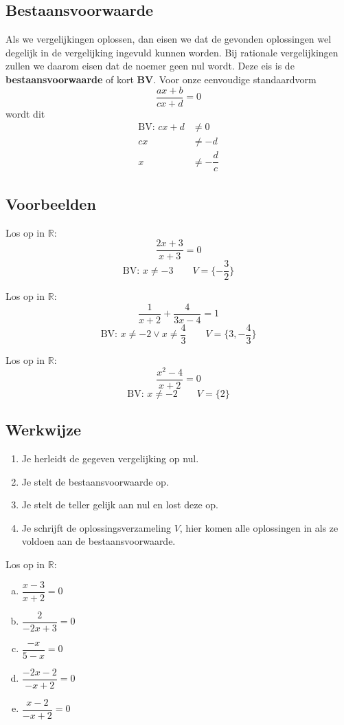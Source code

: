 \documentclass[12pt]{article}
\begin{document}
\subsection{Bestaansvoorwaarde}
Als we vergelijkingen oplossen, dan eisen we dat de gevonden oplossingen wel degelijk in de vergelijking ingevuld kunnen worden. Bij rationale vergelijkingen zullen we daarom eisen dat de noemer geen nul wordt. Deze eis is de {\bf bestaansvoorwaarde} of kort {\bf BV}. Voor onze eenvoudige standaardvorm
$$\dfrac{ax+b}{cx+d}=0$$
wordt dit
\begin{align*}
  \mbox{BV: } cx+d &\neq 0\\
                cx &\neq -d\\
                 x &\neq -\dfrac{d}{c}
\end{align*}


\subsection{Voorbeelden}

Los op in $\mathbb{R}$:
$$\frac{2x+3}{x+3} = 0$$
$$\mbox{BV: }x\neq -3 \qquad V=\{-\dfrac{3}{2}\}$$


Los op in $\mathbb{R}$:
$$\frac{1}{x+2}+\frac{4}{3x-4}=1$$
$$\mbox{BV: }x\neq -2 \vee x\neq \dfrac{4}{3} \qquad V=\{3,-\dfrac{4}{3}\}$$

Los op in $\mathbb{R}$:
$$\frac{x^2-4}{x+2}=0$$
$$\mbox{BV: }x\neq -2 \qquad V=\{2\}$$

\subsection{Werkwijze}
\begin{enumerate}[(1)]
  \item Je herleidt de gegeven vergelijking op nul.
  \item Je stelt de bestaansvoorwaarde op.
  \item Je stelt de teller gelijk aan nul en lost deze op.
  \item Je schrijft de oplossingsverzameling $V$, hier komen alle oplossingen in als ze voldoen aan de bestaansvoorwaarde.
\end{enumerate}

\begin{oefening}
Los op in $\mathbb{R}$:\\
\begin{enumerate}[(a)]
  \itemsep1em
  \item $\dfrac{x-3}{x+2}=0$
  \item $\dfrac{2}{-2x+3}=0$
  \item $\dfrac{-x}{5-x}=0$
  \item $\dfrac{-2x-2}{-x+2}=0$
  \item $\dfrac{x-2}{-x+2}=0$
\end{enumerate}
\end{oefening}
\end{document}
